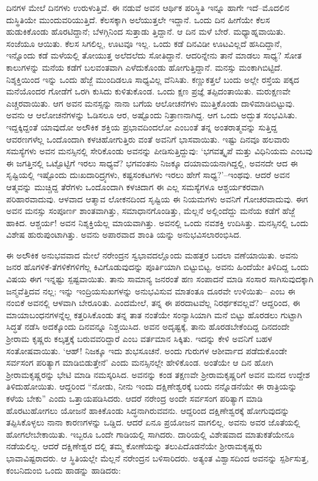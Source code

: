 ದಿನಗಳ ಮೇಲೆ ದಿನಗಳು ಉರುಳುತ್ತಿವೆ. ಈ ನಡುವೆ ಅವನ ಆರ್ಥಿಕ ಪರಿಸ್ಥಿತಿ ಇನ್ನೂ ಹಾಗೇ ಇದೆ–ಮೊದಲಿನ ದುಸ್ಥಿತಿಯೇ ಮುಂದುವರಿಯುತ್ತಿದೆ. ಕೆಲಸಕ್ಕಾಗಿ ಅಲೆಯುತ್ತಲೇ ಇದ್ದಾನೆ. ಒಂದು ದಿನ ಹೀಗೆಯೇ ಕೆಲಸ ಹುಡುಕಿಕೊಂಡು ಹೊರಟಿದ್ದಾನೆ; ಬೆಳಗ್ಗಿನಿಂದ ಸುತ್ತಾಡು ತ್ತಿದ್ದಾನೆ. ಆ ದಿನ ಮಳೆ ಬೇರೆ. ಮಧ್ಯಾಹ್ನವಾಯಿತು. ಸಂಜೆಯೂ ಆಯಿತು. ಕೆಲಸ ಸಿಗಲಿಲ್ಲ, ಊಟವೂ ಇಲ್ಲ. ಒಂದು ಕಡೆ ದಿನವಿಡೀ ಊಟವಿಲ್ಲದೆ ಹಸಿದಿದ್ದಾನೆ, ಇನ್ನೊಂದು ಕಡೆ ಮಳೆಯಲ್ಲಿ ತೋಯುತ್ತ ಅಲೆದಲೆದು ಸೋತಿದ್ದಾನೆ. ಆದರಿನ್ನೇನು ತಾನೆ ಮಾಡಲು ಸಾಧ್ಯ? ಸೋತ ಕಾಲುಗಳನ್ನು ಮನೆಯ ಕಡೆಗೆ ಬಲವಂತವಾಗಿ ಎಳೆದುಕೊಂಡು ಹೋಗುತ್ತಿದ್ದಾನೆ. ಮನಸ್ಸು ಮಂಕಾಗಿಬಿಟ್ಟಿದೆ. ನಿಶ್ಶಕ್ತಿಯಿಂದ ಇನ್ನು ಒಂದು ಹೆಜ್ಜೆ ಮುಂದಿಡಲೂ ಸಾಧ್ಯವಿಲ್ಲ ವೆನಿಸಿತು. ಕಣ್ಣುಕತ್ತಲೆ ಬಂದು ಅಲ್ಲೇ ರಸ್ತೆಯ ಪಕ್ಕದ ಮನೆಯೊಂದರ ಗೋಡೆಗೆ ಒರಗಿ ಕುಸಿದು ಕುಳಿತುಕೊಂಡ. ಒಂದು ಕ್ಷಣ ಪ್ರಜ್ಞೆ ತಪ್ಪಿದಂತಾಯಿತು. ಮರುಕ್ಷಣವೇ ಎಚ್ಚರವಾಯಿತು. ಆಗ ಅವನ ಮನಸ್ಸನ್ನು ನಾನಾ ಬಗೆಯ ಆಲೋಚನೆಗಳು ಮುತ್ತಿಕೊಂಡು ದಾಳಿಮಾಡಿಬಿಟ್ಟುವು. ಅವನು ಆ ಆಲೋಚನೆಗಳನ್ನು ಓಡಿಸಲೂ ಆರ, ಅಷ್ಟೊಂದು ನಿತ್ರಾಣನಾಗಿದ್ದ. ಆಗ ಒಂದು ಅದ್ಭುತ ಸಂಭವಿಸಿತು. ಇದ್ದಕ್ಕಿದ್ದಂತೆ ಯಾವುದೋ ಅಲೌಕಿಕ ಶಕ್ತಿಯ ಪ್ರಭಾವದಿಂದಲೋ ಎಂಬಂತೆ ತನ್ನ ಅಂತರಾತ್ಮವನ್ನು ಸುತ್ತಿದ್ದ ಆವರಣಗಳೆಲ್ಲ ಒಂದೊಂದಾಗಿ ಕಳಚಿಹೋಗುತ್ತಿರು ವಂತೆ ಅವನಿಗೆ ಭಾಸವಾಯಿತು. ಇಷ್ಟು ದಿನವೂ ಹಲವಾರು ಸಮಸ್ಯೆಗಳು ಅವನ ಮನಸ್ಸಿನಲ್ಲಿ ಸೇರಿಕೊಂಡು ಅವನನ್ನು ಪೀಡಿಸುತ್ತಿದ್ದುವು: ‘ಭಗವತ್ಕೃಪೆ ಮತ್ತು ವಿಧಿನಿಯಮ ಎಂಬವು ಈ ಜಗತ್ತಿನಲ್ಲಿ ಒಟ್ಟೊಟ್ಟಿಗೆ ಇರಲು ಸಾಧ್ಯವೆ? ಭಗವಂತನು ನಿಜಕ್ಕೂ ದಯಾಮಯನಾಗಿದ್ದಲ್ಲಿ, ಅವನದೇ ಆದ ಈ ಸೃಷ್ಟಿಯಲ್ಲಿ ಇಷ್ಟೊಂದು ದುಃಖದಾರಿದ್ರ್ಯಗಳು, ಕಷ್ಟಸಂಕಟಗಳು ಇರಲು ಹೇಗೆ ಸಾಧ್ಯ?’–ಇಂಥವು. ಆದರೆ ಅವನ ಆತ್ಮವನ್ನು ಮುಚ್ಚಿದ್ದ ತೆರೆಗಳು ಒಂದೊಂದಾಗಿ ಕಳಚಿದಾಗ ಈ ಎಲ್ಲ ಸಮಸ್ಯೆಗಳೂ ಆಶ್ಚರ್ಯಕರವಾಗಿ ಪರಿಹಾರವಾದುವು. ಆಳವಾದ ಆತ್ಮಾವ ಲೋಕನದಿಂದ ಸೃಷ್ಟಿಯ ಈ ನಿಯಮಗಳು ಅವನಿಗೆ ಗೋಚರವಾದುವು. ಈಗ ಅವನ ಮನಸ್ಸು ಸಂಪೂರ್ಣ ಶಾಂತವಾಗಿತ್ತು, ಸಮಾಧಾನಗೊಂಡಿತ್ತು, ಮೆಲ್ಲನೆ ಅಲ್ಲಿಂದೆದ್ದು ಮನೆಯ ಕಡೆಗೆ ಹೆಜ್ಜೆ ಹಾಕಿದ. ಆಶ್ಚರ್ಯ! ಅವನ ನಿಶ್ಶಕ್ತಿಯೆಲ್ಲ ಮಾಯವಾಗಿತ್ತು. ಅವನಲ್ಲಿ ಒಂದು ನವಶಕ್ತಿ ಉದಿಸಿತ್ತು. ಮನಸ್ಸಿನಲ್ಲಿ ಒಂದು ವಿಶೇಷ ಹುರುಪುಂಟಾಗಿತ್ತು. ಅವನು ಅಪಾರವಾದ ಶಾಂತಿ ಯನ್ನು ಅನುಭವಿಸಲಾರಂಭಿಸಿದ.

ಈ ಅಲೌಕಿಕ ಅನುಭವವಾದ ಮೇಲೆ ನರೇಂದ್ರನ ಸ್ವಭಾವದಲ್ಲೊಂದು ಮಹತ್ತರ ಬದಲಾ ವಣೆಯಾಯಿತು. ಅವನು ಜನರ ಹೊಗಳಿಕೆ-ತೆಗಳಿಕೆಗಳಿಗೆಲ್ಲ ಕಿವಿಗೊಡುವುದನ್ನು ಪೂರ್ತಿಯಾಗಿ ಬಿಟ್ಟುಬಿಟ್ಟ. ಅವನು ಹಿಂದೆಯೇ ತಿಳಿದಿದ್ದ ಒಂದು ವಿಷಯ ಈಗ ಇನ್ನಷ್ಟು ಸ್ಪಷ್ಟವಾಯಿತು. ತಾನು ಸಾಮಾನ್ಯ ಜನರಂತೆ ಹಣ ಸಂಪಾದನೆ ಮಾಡಿ ಸಂಸಾರ ಸಾಗಿಸುವುದಕ್ಕಾಗಿ ಜನ್ಮವೆತ್ತಿದವ ನಲ್ಲ; ಇನ್ನು ಇಂದ್ರಿಯಸುಖಗಳನ್ನು ಅನುಭವಿಸುವ ಮಾತಂತೂ ದೂರವೇ ಉಳಿಯಿತು– ಎಂಬ ಈ ನಂಬಿಕೆ ಅವನಲ್ಲಿ ಆಳವಾಗಿ ಬೇರೂರಿತು. ಎಂದಮೇಲೆ, ತನ್ನ ಈ ಪರದಾಟವೆಲ್ಲ ನಿರರ್ಥಕವಲ್ಲವೆ? ಆದ್ದರಿಂದ, ಈ ಮಾಯಾಬಂಧನಗಳನ್ನೆಲ್ಲ ಕತ್ತರಿಸಿಕೊಂಡು ತನ್ನ ತಾತ ನಂತೆಯೇ ಸಂನ್ಯಾಸಿಯಾಗಿ ಮನೆ ಬಿಟ್ಟು ಹೊರಡಲು ಗುಟ್ಟಾಗಿ ಸಿದ್ಧತೆ ನಡೆಸಿ ಅದಕ್ಕೊಂದು ದಿನವನ್ನೂ ನಿಶ್ಚಯಿಸಿದ. ಅವನ ಅದೃಷ್ಟಕ್ಕೆ, ತಾನು ಹೊರಡಬೇಕೆಂದಿದ್ದ ದಿನದಂದೇ ಶ್ರೀರಾಮ ಕೃಷ್ಣರು ಕಲ್ಕತ್ತಕ್ಕೆ ಬರುವವರಿದ್ದಾರೆ ಎಂಬ ವರ್ತಮಾನ ಸಿಕ್ಕಿತು. ಇದನ್ನು ಕೇಳಿ ಅವನಿಗೆ ಬಹಳ ಸಂತೋಷವಾಯಿತು. ‘ಆಹ್! ನಿಜಕ್ಕೂ ಇದು ಶುಭಸೂಚನೆ. ಅಂದು ಗುರುಗಳ ಆಶೀರ್ವಾದ ಪಡೆದುಕೊಂಡೇ ಸರ್ವಸಂಗ ಪರಿತ್ಯಾಗ ಮಾಡಿಬಿಡುತ್ತೇನೆ’ ಎಂದು ಮನಸ್ಸಿನಲ್ಲೇ ಹೇಳಿಕೊಂಡ. ಅಂತೆಯೇ ಆ ದಿನ ಹೋಗಿ ಶ್ರೀರಾಮಕೃಷ್ಣರನ್ನು ಭೇಟಿ ಮಾಡಿ ನಮಸ್ಕರಿಸಿದ. ಅವನನ್ನು ಕಂಡ ತಕ್ಷಣವೇ ಶ್ರೀರಾಮಕೃಷ್ಣರಿಗೆ ಅವನ ಮನದ ಉದ್ದೇಶ ತಿಳಿದುಹೋಯಿತು. ಆದ್ದರಿಂದ “ನೋಡು, ನೀನು ಇಂದು ದಕ್ಷಿಣೇಶ್ವರಕ್ಕೆ ಬಂದು ನನ್ನೊಡನೆಯೇ ಈ ರಾತ್ರಿಯನ್ನು ಕಳೆಯ ಬೇಕು” ಎಂದು ಒತ್ತಾಯಪಡಿಸಿದರು. ಆದರೆ ನರೇಂದ್ರ ಅಂದೇ ಸರ್ವಸಂಗ ಪರಿತ್ಯಾಗ ಮಾಡಿ ಹೊರಟುಹೋಗಲು ಯೋಜನೆ ಹಾಕಿಕೊಂಡು ಸಿದ್ಧನಾಗಿರುವವನು. ಆದ್ದರಿಂದ ದಕ್ಷಿಣೇಶ್ವರಕ್ಕೆ ಹೋಗುವುದನ್ನು ತಪ್ಪಿಸಿಕೊಳ್ಳಲು ನಾನಾ ಕಾರಣಗಳನ್ನು ಒಡ್ಡಿದ. ಆದರೆ ಏನೂ ಪ್ರಯೋಜನ ವಾಗಲಿಲ್ಲ. ಅವನು ಅವರ ಜೊತೆಯಲ್ಲಿ ಹೋಗಲೇಬೇಕಾಯಿತು. ಇಬ್ಬರೂ ಒಂದೇ ಗಾಡಿಯಲ್ಲಿ ಸಾಗಿದರು. ದಾರಿಯಲ್ಲಿ ವಿಶೇಷವಾದ ಮಾತುಕತೆಯೇನೂ ನಡೆಯಲಿಲ್ಲ. ಆದರೆ ದಕ್ಷಿಣೇಶ್ವರ ದಲ್ಲಿ ತಮ್ಮ ಕೋಣೆಯನ್ನು ತಲುಪಿದೊಡನೆಯೇ ಶ್ರೀರಾಮಕೃಷ್ಣರು ಭಾವಾವಿಷ್ಟರಾದರು. ಆ ಸ್ಥಿತಿಯಲ್ಲೇ ಮೆಲ್ಲನೆ ನರೇಂದ್ರನ ಬಳಿಸಾರಿದರು. ಅತ್ಯಂತ ವಿಶ್ವಾಸದಿಂದ ಅವನನ್ನು ಸ್ಪರ್ಶಿಸುತ್ತ, ಕಂಬನಿದುಂಬಿ ಒಂದು ಹಾಡನ್ನು ಹಾಡಿದರು:

